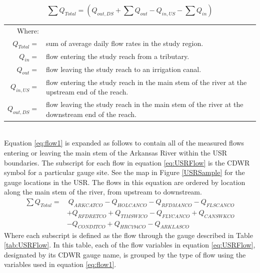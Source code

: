 \begin{linenumbers}
\begin{equation}
\label{eq:flow1}
\sum Q_{Total} = \left( Q_{out,DS} + \sum Q_{out} - Q_{in,US} - \sum Q_{in} \right) 
\end{equation}
\begin{tabular}{r L{5.5in}}
	Where: & \\
	$ Q_{Total} = $ & sum of average daily flow rates in the study region.\\
	$ Q_{in} = $ & flow entering the study reach from a tributary.\\
	$ Q_{out} = $ & flow leaving the study reach to an irrigation canal.\\
	$ Q_{in,US} = $ & flow entering the study reach in the main stem of the river at the upstream end of the reach.\\
	$ Q_{out,DS} = $ & flow leaving the study reach in the main stem of the river at the downstream end of the reach.\\
\end{tabular}\\

Equation \ref{eq:flow1} is expanded as follows to contain all of the measured flows entering or leaving the main stem of the Arkansas River within the USR boundaries.  The subscript for each flow in equation \ref{eq:USRFlow} is the CDWR symbol for a particular gauge site.  See the map in Figure \ref{USRSample} for the gauge locations in the USR.  The flows in this equation are ordered by location along the main stem of the river, from upstream to downstream.
\begin{align}
	\label{eq:USRFlow}
	\sum Q_{Total} = &~Q_{ARKCATCO} - Q_{HOLCANCO} - Q_{RFDMANCO} - Q_{FLSCANCO} \\
	\nonumber & + Q_{RFDRETCO} + Q_{TIMSWICO} - Q_{FLYCANCO} + Q_{CANSWKCO} \\ 
	\nonumber & - Q_{CONDITCO} + Q_{HRC194CO} - Q_{ARKLASCO}
\end{align}
Where each subscript is defined as the flow through the gauge described in Table \ref{tab:USRFlow}.  In this table, each of the flow variables in equation \ref{eq:USRFlow}, designated by its CDWR gauge name, is grouped by the type of flow using the variables used in equation \ref{eq:flow1}.


\end{linenumbers}
